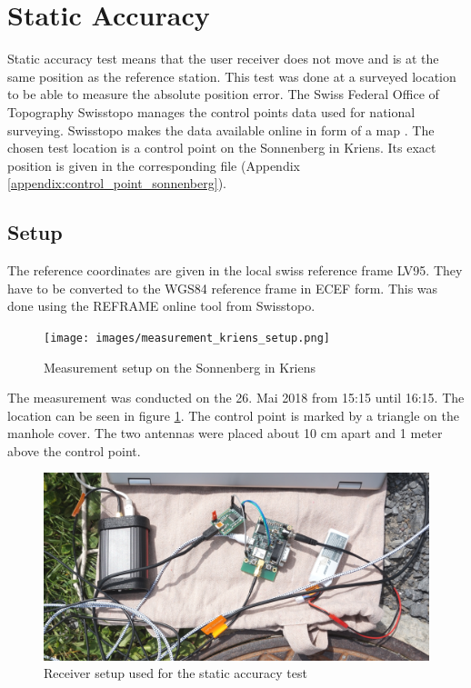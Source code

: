 \section{Static Accuracy}\label{sec:static_accuracy}

Static accuracy test means that the user receiver does not move and is at the same position as the reference station.
This test was done at a surveyed location to be able to measure the absolute position error.
The Swiss Federal Office of Topography Swisstopo manages the control points data used for national surveying.
Swisstopo makes the data available online in form of a map \cite{Swisstopo}.
The chosen test location is a control point on the Sonnenberg in Kriens.
Its exact position is given in the corresponding file (Appendix \ref{appendix:control_point_sonnenberg}).

\newpage

\subsection{Setup}

The reference coordinates are given in the local swiss reference frame LV95.
They have to be converted to the WGS84 reference frame in ECEF form.
This was done using the REFRAME online tool from Swisstopo.

\begin{figure}[ht]
 \centering
 \texttt{[image: images/measurement\_kriens\_setup.png]}
 \caption{Measurement setup on the Sonnenberg in Kriens}
 \label{fig:measurement_kriens_setup}
\end{figure}

The measurement was conducted on the 26. Mai 2018 from 15:15 until 16:15.
The location can be seen in figure \ref{fig:measurement_kriens_setup}.
The control point is marked by a triangle on the manhole cover.
The two antennas were placed about 10 cm apart and 1 meter above the control point.

\newpage

\begin{figure}[ht]
 \centering
 \includegraphics[width=\textwidth]{images/measurement_kriens_receiver.jpg}
 \caption{Receiver setup used for the static accuracy test}
 \label{fig:measurement_kriens_receiver}
\end{figure}


